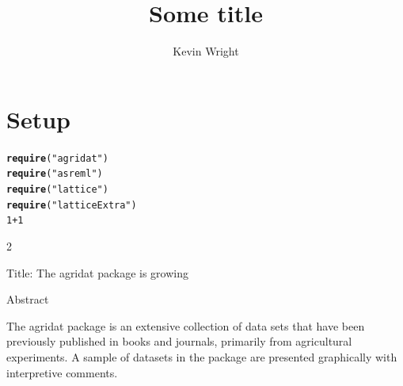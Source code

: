 \documentclass[12pt]{article}\usepackage[]{graphicx}\usepackage[]{color}
\makeatletter
\newcommand{\hlnum}[1]{\textcolor[rgb]{0.686,0.059,0.569}{#1}}%
\newcommand{\hlstr}[1]{\textcolor[rgb]{0.192,0.494,0.8}{#1}}%
\newcommand{\hlopt}[1]{\textcolor[rgb]{0,0,0}{#1}}%
\newcommand{\hlstd}[1]{\textcolor[rgb]{0.345,0.345,0.345}{#1}}%
\newcommand{\hlkwd}[1]{\textcolor[rgb]{0.737,0.353,0.396}{\textbf{#1}}}%
\newenvironment{kframe}{%
 \def\at@end@of@kframe{}%
 \ifinner\ifhmode%
  \def\at@end@of@kframe{\end{minipage}}%
  \begin{minipage}{\columnwidth}%
 \fi\fi%
 \def\FrameCommand##1{\hskip\@totalleftmargin \hskip-\fboxsep
 \colorbox{shadecolor}{##1}\hskip-\fboxsep
     \hskip-\linewidth \hskip-\@totalleftmargin \hskip\columnwidth}%
 \MakeFramed {\advance\hsize-\width
   \@totalleftmargin\z@ \linewidth\hsize
   \@setminipage}}%
 {\par\unskip\endMakeFramed%
 \at@end@of@kframe}
\newenvironment{knitrout}{}{} %
\makeatother
\begin{document}
\title{Some title}
\author{Kevin Wright}
\maketitle
\thispagestyle{fancy}



\section{Setup}
\begin{knitrout}
\color{fgcolor}\begin{kframe}
\begin{alltt}
\hlkwd{require}\hlstd{(}\hlstr{"agridat"}\hlstd{)}
\hlkwd{require}\hlstd{(}\hlstr{"asreml"}\hlstd{)}
\hlkwd{require}\hlstd{(}\hlstr{"lattice"}\hlstd{)}
\hlkwd{require}\hlstd{(}\hlstr{"latticeExtra"}\hlstd{)}
\hlnum{1}\hlopt{+}\hlnum{1}
\end{alltt}
\begin{Soutput}
[1] 2
\end{Soutput}
\end{kframe}
\end{knitrout}



Title: The agridat package is growing

Abstract

The agridat package is an extensive collection of
data sets that have been previously published in
books and journals, primarily from agricultural
experiments.  A sample of datasets in the package
are presented graphically with interpretive comments.

\section{}
\end{document}
